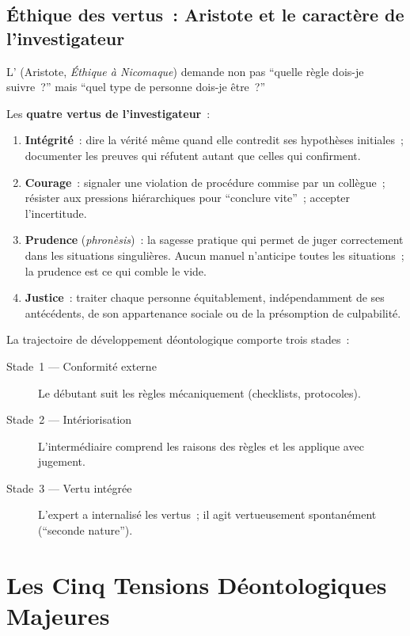 \subsection{Éthique des vertus~: Aristote et le caractère de l'investigateur}

L' (Aristote,
\textit{Éthique à Nicomaque}) demande non pas ``quelle règle dois-je
suivre~?'' mais ``quel type de personne dois-je être~?''

Les \textbf{quatre vertus de l'investigateur}~:
\begin{enumerate}
    \item \textbf{Intégrité}~: dire la vérité même quand elle contredit
          ses hypothèses initiales~; documenter les preuves qui réfutent
          autant que celles qui confirment.
    \item \textbf{Courage}~: signaler une violation de procédure commise
          par un collègue~; résister aux pressions hiérarchiques pour
          ``conclure vite''~; accepter l'incertitude.
    \item \textbf{Prudence} (\textit{phronèsis})~: la sagesse pratique
          qui permet de juger correctement dans les situations singulières.
          Aucun manuel n'anticipe toutes les situations~; la prudence
          est ce qui comble le vide.
    \item \textbf{Justice}~: traiter chaque personne équitablement,
          indépendamment de ses antécédents, de son appartenance sociale
          ou de la présomption de culpabilité.
\end{enumerate}

La trajectoire de développement déontologique comporte trois stades~:
\begin{description}
    \item[Stade~1 --- Conformité externe] Le débutant suit les règles
          mécaniquement (checklists, protocoles).
    \item[Stade~2 --- Intériorisation] L'intermédiaire comprend les
          raisons des règles et les applique avec jugement.
    \item[Stade~3 --- Vertu intégrée] L'expert a internalisé les vertus~;
          il agit vertueusement spontanément (``seconde nature'').
\end{description}

\section{Les Cinq Tensions Déontologiques Majeures}
\label{sec:tensions}

